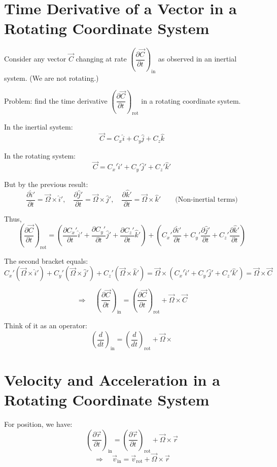 \section{Time Derivative of a Vector in a Rotating Coordinate System}

Consider any vector $\vec{C}$ changing at rate $\left(\dfrac{\partial\vec{C}}{\partial t}\right)_\text{in}$ as observed in an inertial system. (We are not rotating.)

Problem: find the time derivative $\left(\dfrac{\partial\vec{C}}{\partial t}\right)_\text{rot}$ in a rotating coordinate system.

In the inertial system:
\[
  \vec{C} = C_x\hat{i} + C_y\hat{j} + C_z\hat{k}
\]

In the rotating system:
\[
  \vec{C} = C_x'\hat{i}' + C_y'\hat{j}' + C_z'\hat{k}'
\]

But by the previous result:
\[
  \frac{\partial\hat{i}'}{\partial t} = \vec{\Omega}\times\hat{i}', \quad
  \frac{\partial\hat{j}'}{\partial t} = \vec{\Omega}\times\hat{j}', \quad
  \frac{\partial\hat{k}'}{\partial t} = \vec{\Omega}\times\hat{k}' \qquad \text{(Non-inertial terms)}
\]

Thus,
\[
  \left(\frac{\partial\vec{C}}{\partial t}\right)_\text{rot} = \left(\frac{\partial C_x'}{\partial t}\hat{i}' + \frac{\partial C_y'}{\partial t}\hat{j}' + \frac{\partial C_z'}{\partial t}\hat{k}'\right)
  + \left(C_x'\frac{\partial\hat{i}'}{\partial t} + C_y'\frac{\partial\hat{j}'}{\partial t} + C_z'\frac{\partial\hat{k}'}{\partial t}\right)
\]

The second bracket equals:
\[
  C_x'(\vec{\Omega}\times\hat{i}') + C_y'(\vec{\Omega}\times\hat{j}') + C_z'(\vec{\Omega}\times\hat{k}') = \vec{\Omega}\times(C_x'\hat{i}' + C_y'\hat{j}' + C_z'\hat{k}') = \vec{\Omega}\times\vec{C}
\]

\[
  \Rightarrow \quad \boxed{\left(\frac{\partial\vec{C}}{\partial t}\right)_\text{in} = \left(\frac{\partial\vec{C}}{\partial t}\right)_\text{rot} + \vec{\Omega}\times\vec{C}}
\]

Think of it as an operator:
\[
  \left(\frac{d}{dt}\right)_\text{in} = \left(\frac{d}{dt}\right)_\text{rot} + \vec{\Omega}\times
\]

\section{Velocity and Acceleration in a Rotating Coordinate System}

For position, we have:
\[
  \left(\frac{\partial\vec{r}}{\partial t}\right)_\text{in} = \left(\frac{\partial\vec{r}}{\partial t}\right)_\text{rot} + \vec{\Omega}\times\vec{r}
\]
\[
  \Rightarrow \quad \vec{v}_\text{in} = \vec{v}_\text{rot} + \vec{\Omega}\times\vec{r}
\]

